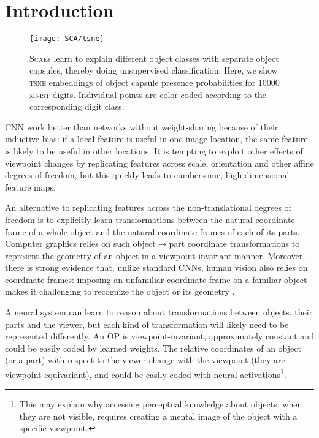 \section{Introduction}

\begin{wrapfigure}{r}{.3\textwidth}
	\centering
	\texttt{[image: SCA/tsne]}
	\caption{
		\textsc{Scae}s learn to explain different object classes with separate object capsules, thereby doing unsupervised classification. 
		Here, we show \textsc{tsne} embeddings of object capsule presence probabilities for $10000$ \textsc{mnist} digits.
		Individual points are color-coded according to the corresponding digit class.
	}
	\label{fig:tsne}
\end{wrapfigure}

\Gls{CNN} work better than networks without weight-sharing because of their inductive bias: if a local feature is useful in one image location, the same feature is likely to be useful in other locations. It is tempting to exploit other effects of viewpoint changes by replicating features across scale, orientation and other affine degrees of freedom, but this quickly leads to cumbersome, high-dimensional feature maps.

An alternative to replicating features across the non-translational degrees of freedom is to explicitly learn transformations between the natural coordinate frame of a whole object and the natural coordinate frames of each of its parts.   Computer graphics relies on such object$\rightarrow$part coordinate transformations to represent the geometry of an object in a viewpoint-invariant manner. Moreover, there is strong evidence that, unlike standard \gls{CNN}s, human vision also relies on coordinate frames: imposing an unfamiliar coordinate frame on a familiar object makes it challenging to recognize the object or its geometry \citep{Rock73, Hinton79}.

A neural system can learn to reason about transformations between objects, their parts and the viewer, but each kind of transformation will likely need to be represented differently.
An \gls{OP} is viewpoint-invariant, approximately constant and could be easily coded by learned weights.  
The relative coordinates of an object (or a part) with respect to the viewer change with the viewpoint (they are viewpoint-equivariant), and could be easily coded with neural activations\footnote{
	This may explain why accessing perceptual knowledge about objects, when they are not visible, requires creating a mental image of the object with a specific viewpoint.
}.

